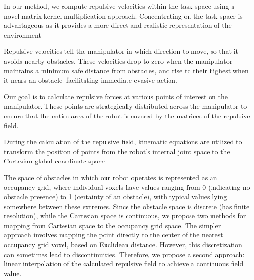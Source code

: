 \documentclass[]{article}
\begin{document}
% 
% 

In our method, we compute repulsive velocities within the task space using a novel matrix kernel multiplication approach. Concentrating on the task space is advantageous as it provides a more direct and realistic representation of the environment. 

Repulsive velocities tell the manipulator in which direction to move, so that it avoids nearby obstacles. These velocities drop to zero when the manipulator maintains a minimum safe distance from obstacles, and rise to their highest when it nears an obstacle, facilitating immediate evasive action. 

Our goal is to calculate repulsive forces at various points of interest on the manipulator. These points  are strategically distributed across the manipulator to ensure that the entire area of the robot is covered by the matrices of the repulsive field.

During the calculation of the repulsive field, kinematic equations are utilized to transform the position of points from the robot's internal joint space to the Cartesian global coordinate space.

The space of obstacles in which our robot operates is represented as an occupancy grid, where individual voxels have values ranging from 0 (indicating no obstacle presence) to 1 (certainty of an obstacle), with typical values lying somewhere between these extremes. Since the obstacle space is discrete (has finite resolution), while the Cartesian space is continuous, we propose two methods for mapping from Cartesian space to the occupancy grid space. The simpler approach involves mapping the point directly to the center of the nearest occupancy grid voxel, based on Euclidean distance. However, this discretization can sometimes lead to discontinuities. Therefore, we propose a second approach: linear interpolation of the calculated repulsive field to achieve a continuous field value.
\end{document}
